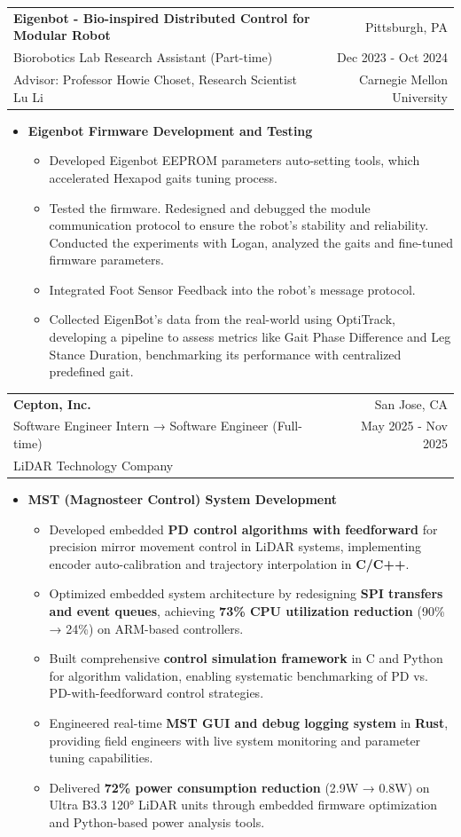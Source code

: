 \documentclass[a4paper]{article}
\makeatletter
\newcommand{\resumeExperienceSubheading}[6]{
  \vspace{5pt}\item
    \begin{tabular*}{0.98\textwidth}{@{\hspace{-0.5em}}l@{\extracolsep{\fill}}r@{}}
      \textbf{#1} & {#2} \\
      {#3} & {#4} \\
      {#5} & {#6}
    \end{tabular*}
  \vspace{-6pt}
}
\newcommand{\resumeExperienceItemListStart}{\begin{itemize}[leftmargin=*]}
\newcommand{\resumeExperienceItemListEnd}{\end{itemize}\vspace{-5pt}}
\newcommand{\resumeExperienceItem}[1]{\item{{#1 \vspace{-1pt}}}}
\newcommand{\resumeExperienceSubItemListStart}{\begin{itemize}[leftmargin=*]}
\newcommand{\resumeExperienceSubItemListEnd}{\end{itemize}\vspace{-5pt}}
\newcommand{\resumeExperienceSubItem}[2]{
  \item{
    \textbf{#1}
    {#2 \vspace{-2pt}}
  }
}
\makeatother
\begin{document}
\resumeExperienceSubheading
{Eigenbot - Bio-inspired Distributed Control for Modular Robot} {Pittsburgh, PA}
{Biorobotics Lab Research Assistant (Part-time)} {Dec 2023 - Oct 2024}
{Advisor: Professor Howie Choset, Research Scientist Lu Li} {Carnegie Mellon University}
\resumeExperienceSubItemListStart
\resumeExperienceSubItem{Eigenbot Firmware Development and Testing}{
  \resumeExperienceItemListStart
  \resumeExperienceItem{Developed Eigenbot EEPROM parameters auto-setting tools, which accelerated Hexapod gaits tuning process.}
  \resumeExperienceItem{Tested the firmware. Redesigned and debugged the module communication protocol to ensure the robot's stability and reliability. Conducted the experiments with Logan, analyzed the gaits and fine-tuned firmware parameters.}
  \resumeExperienceItem{Integrated Foot Sensor Feedback into the robot's message protocol.}
  \resumeExperienceItem{Collected EigenBot's data from the real-world using OptiTrack, developing a pipeline to assess metrics like Gait Phase Difference and Leg Stance Duration, benchmarking its performance with centralized predefined gait.}
  \resumeExperienceItemListEnd
}
\resumeExperienceSubItemListEnd

\resumeExperienceSubheading
{Cepton, Inc.} {San Jose, CA}
{Software Engineer Intern → Software Engineer (Full-time)} {May 2025 - Nov 2025}
{LiDAR Technology Company} {}
\resumeExperienceSubItemListStart
\resumeExperienceSubItem{MST (Magnosteer Control) System Development}{
  \resumeExperienceItemListStart
  \resumeExperienceItem{Developed embedded \textbf{PD control algorithms with feedforward} for precision mirror movement control in LiDAR systems, implementing encoder auto-calibration and trajectory interpolation in \textbf{C/C++}.}
  \resumeExperienceItem{Optimized embedded system architecture by redesigning \textbf{SPI transfers and event queues}, achieving \textbf{73\% CPU utilization reduction} (90\% → 24\%) on ARM-based controllers.}
  \resumeExperienceItem{Built comprehensive \textbf{control simulation framework} in C and Python for algorithm validation, enabling systematic benchmarking of PD vs. PD-with-feedforward control strategies.}
  \resumeExperienceItem{Engineered real-time \textbf{MST GUI and debug logging system} in \textbf{Rust}, providing field engineers with live system monitoring and parameter tuning capabilities.}
  \resumeExperienceItem{Delivered \textbf{72\% power consumption reduction} (2.9W → 0.8W) on Ultra B3.3 120° LiDAR units through embedded firmware optimization and Python-based power analysis tools.}
  \resumeExperienceItemListEnd
}
\resumeExperienceSubItemListEnd
\end{document}
